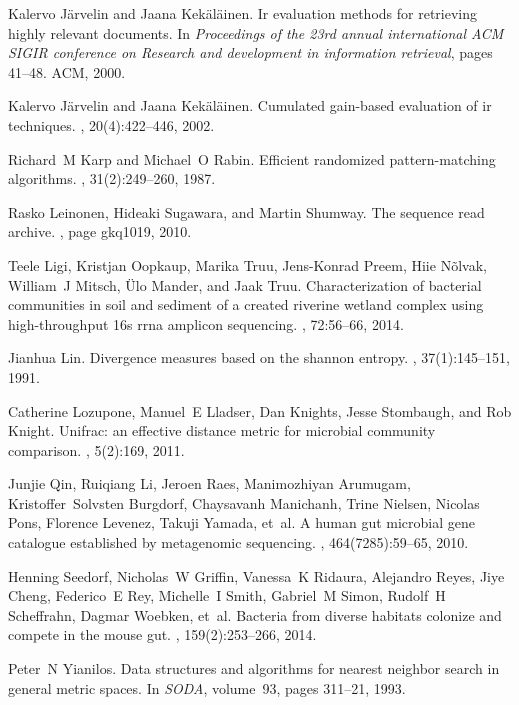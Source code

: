 \documentclass[10pt,letterpaper]{article}
\begin{document}
\begin{thebibliography}{10}
Kalervo J{\"a}rvelin and Jaana Kek{\"a}l{\"a}inen.
\newblock Ir evaluation methods for retrieving highly relevant documents.
\newblock In {\em Proceedings of the 23rd annual international ACM SIGIR
  conference on Research and development in information retrieval}, pages
  41--48. ACM, 2000.

Kalervo J{\"a}rvelin and Jaana Kek{\"a}l{\"a}inen.
\newblock Cumulated gain-based evaluation of ir techniques.
, 20(4):422--446,
  2002.

Richard~M Karp and Michael~O Rabin.
\newblock Efficient randomized pattern-matching algorithms.
, 31(2):249--260, 1987.

Rasko Leinonen, Hideaki Sugawara, and Martin Shumway.
\newblock The sequence read archive.
, page gkq1019, 2010.

Teele Ligi, Kristjan Oopkaup, Marika Truu, Jens-Konrad Preem, Hiie N{\~o}lvak,
  William~J Mitsch, {\"U}lo Mander, and Jaak Truu.
\newblock Characterization of bacterial communities in soil and sediment of a
  created riverine wetland complex using high-throughput 16s rrna amplicon
  sequencing.
, 72:56--66, 2014.

Jianhua Lin.
\newblock Divergence measures based on the shannon entropy.
, 37(1):145--151, 1991.

Catherine Lozupone, Manuel~E Lladser, Dan Knights, Jesse Stombaugh, and Rob
  Knight.
\newblock Unifrac: an effective distance metric for microbial community
  comparison.
, 5(2):169, 2011.

Junjie Qin, Ruiqiang Li, Jeroen Raes, Manimozhiyan Arumugam,
  Kristoffer~Solvsten Burgdorf, Chaysavanh Manichanh, Trine Nielsen, Nicolas
  Pons, Florence Levenez, Takuji Yamada, et~al.
\newblock A human gut microbial gene catalogue established by metagenomic
  sequencing.
, 464(7285):59--65, 2010.

Henning Seedorf, Nicholas~W Griffin, Vanessa~K Ridaura, Alejandro Reyes, Jiye
  Cheng, Federico~E Rey, Michelle~I Smith, Gabriel~M Simon, Rudolf~H
  Scheffrahn, Dagmar Woebken, et~al.
\newblock Bacteria from diverse habitats colonize and compete in the mouse gut.
, 159(2):253--266, 2014.

Peter~N Yianilos.
\newblock Data structures and algorithms for nearest neighbor search in general
  metric spaces.
\newblock In {\em SODA}, volume~93, pages 311--21, 1993.

\end{thebibliography}
\end{document}
